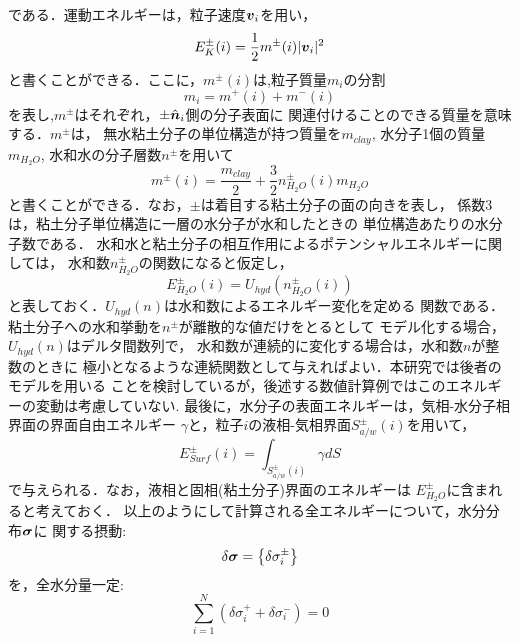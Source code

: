 ﻿\documentclass[11pt,a4j]{jarticle}
\begin{document}
である．運動エネルギーは，粒子速度$\mbox{\boldmath $v$}_i$を用い，
\begin{equation}
	E_K^{\pm}(i)=\frac{1}{2}m^{\pm}(i) |\mbox{\boldmath $v$}_i|^2 
	\label{eqn:def_EK}
\end{equation}
と書くことができる．ここに，$m^\pm(i)$は,粒子質量$m_i$の分割
\begin{equation}
	m_i=m^+(i)+m^-(i)
	\label{eqn:mi_split}
\end{equation}
を表し,$m^{\pm}$はそれぞれ，$\pm\hat{\mbox{\boldmath $n$}}_i$側の分子表面に
関連付けることのできる質量を意味する．$m^\pm$は，
無水粘土分子の単位構造が持つ質量を$m_{clay}$, 
水分子1個の質量$m_{H_2O}$,
水和水の分子層数$n^{\pm}$を用いて
\begin{equation}
	m^{\pm}(i)=\frac{m_{clay}}{2}+\frac{3}{2}n_{H_2O}^{\pm}(i)m_{H_2O}
	\label{eqn:def_mpm}
\end{equation}
と書くことができる．なお，$\pm$は着目する粘土分子の面の向きを表し，
係数$3$は，粘土分子単位構造に一層の水分子が水和したときの
単位構造あたりの水分子数である．
水和水と粘土分子の相互作用によるポテンシャルエネルギーに関しては，
水和数$n^\pm_{H_2O}$の関数になると仮定し，
\begin{equation}
	E_{H_2O}^\pm(i)=U_{hyd}
	\left(
		n^\pm_{H_2O}(i)
	\right)
	\label{eqn:def_EH2O}
\end{equation}
と表しておく．$U_{hyd}(n)$は水和数によるエネルギー変化を定める
関数である．粘土分子への水和挙動を$n^\pm$が離散的な値だけをとるとして
モデル化する場合，$U_{hyd}(n)$はデルタ間数列で，
水和数が連続的に変化する場合は，水和数$n$が整数のときに
極小となるような連続関数として与えればよい．本研究では後者のモデルを用いる
ことを検討しているが，後述する数値計算例ではこのエネルギーの変動は考慮していない.
最後に，水分子の表面エネルギーは，気相-水分子相界面の界面自由エネルギー
$\gamma$と，粒子$i$の液相-気相界面$S^\pm_{a/w}(i)$を用いて，
\begin{equation}
	E_{Surf}^{\pm}(i)=\int_{S^\pm_{a/w}(i)}\gamma dS 
	\label{eqn:def_Esurf}
\end{equation}
で与えられる．なお，液相と固相(粘土分子)界面のエネルギーは
$E^\pm_{H_2O}$に含まれると考えておく．
以上のようにして計算される全エネルギーについて，水分分布$\mbox{\boldmath $\sigma$}$に
関する摂動:
\begin{equation}
	\delta \mbox{\boldmath $\sigma$}=\left\{ \delta \sigma^\pm_i \right\}
	\label{eqn:var_sig}
\end{equation}
を，全水分量一定:
\begin{equation}
	\sum_{i=1}^N \left( 
		\delta \sigma^+_i
		+
		\delta \sigma^-_i
	\right)
	=0
\end{equation}
\end{document}
